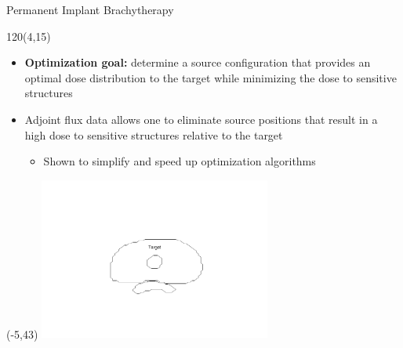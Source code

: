 \documentclass{beamer}
\begin{document}
\begin{frame}{Permanent Implant Brachytherapy}

  \begin{textblock}{120}(4,15)
    \begin{itemize}
      \item \textbf{Optimization goal:} determine a source configuration
        that provides an optimal dose distribution to the target while
        minimizing the dose to sensitive structures
        \medskip
      \item Adjoint flux data allows one to eliminate source positions that 
        result in a high dose to sensitive structures relative to the target
        \smallskip
        \begin{itemize}
          \item Shown to simplify and speed up optimization algorithms
        \end{itemize}
    \end{itemize}
  \end{textblock}




  \begin{textblock}{20}(-5,43)
    \includegraphics[width=3.0in]{figures/organ_contour.pdf}
  \end{textblock}


\end{frame}
\end{document}
